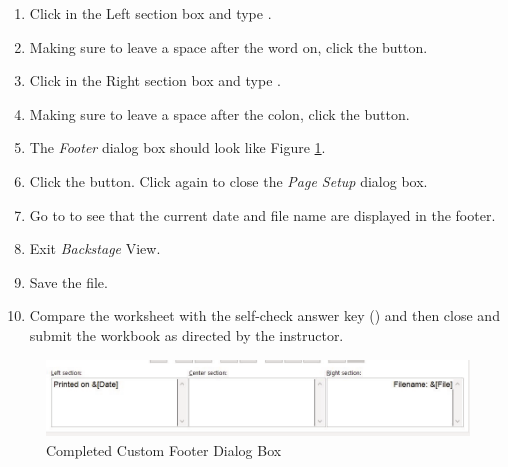 \begin{enumerate}
	\item Click in the Left section box and type .
	\item Making sure to leave a space after the word on, click the  button.
	\item Click in the Right section box and type .
	\item Making sure to leave a space after the colon, click the  button.
	\item The \textit{Footer} dialog box should look like Figure \ref{02:fig46}.
	\item Click the  button. Click  again to close the \textit{Page Setup} dialog box.
	\item Go to  to see that the current date and file name are displayed in the footer.
	\item Exit \textit{Backstage} View.
	\item Save the  file.
	\item Compare the worksheet with the self-check answer key () and then close and submit the  workbook as directed by the instructor.	
\end{enumerate}

\begin{figure}[H]
	\centering
	\includegraphics[width=\maxwidth{.95\linewidth}]{gfx/ch02_fig46}
	\caption{Completed Custom Footer Dialog Box}
	\label{02:fig46}
\end{figure}


